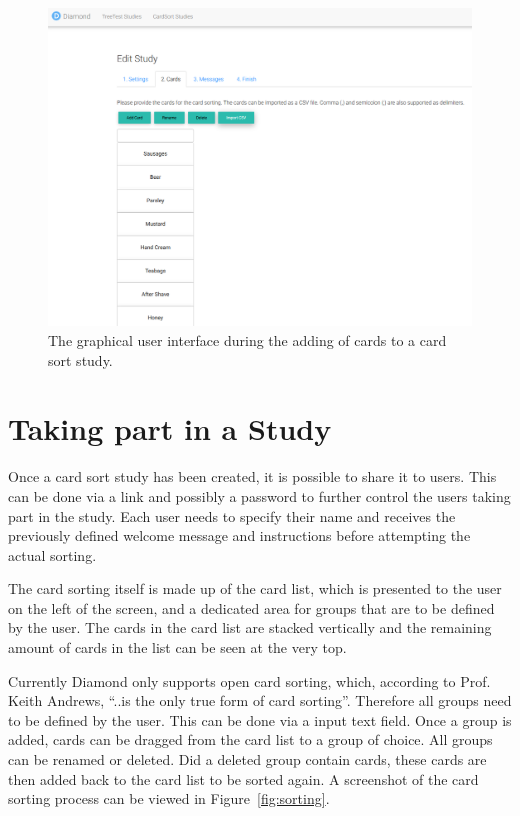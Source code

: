 \begin{figure}[tp]  \centering
\includegraphics[keepaspectratio,width=\linewidth,height=\halfh]{images/implementation/create.png}
\caption[Card Sort Study Creation] 
{The graphical user interface during the adding of cards to a card sort study.
 } 
\label{fig:creation} 
\end{figure}

\section{Taking part in a Study}

Once a card sort study has been created, it is possible to share it to users.
This can be done via a link and possibly a password to further control the users
taking part in the study. Each user needs to specify their name and receives
the previously defined welcome message and instructions before attempting the
actual sorting.

The card sorting itself is made up of the card list, which is presented to the
user on the left of the screen, and a dedicated area for groups that are to be
defined by the user. The cards in the card list are stacked vertically and the
remaining amount of cards in the list can be seen at the very top.  

Currently Diamond only supports open card sorting, which, according to Prof.
Keith Andrews, ``..is the only true form of card sorting''. Therefore all groups
need to be defined by the user. This can be done via a input text field. Once a
group is added, cards can be dragged from the card list to a group of choice.
All groups can be renamed or deleted. Did a deleted group contain cards, these
cards are then added back to the card list to be sorted again. A screenshot of
the card sorting process can be viewed in Figure~\ref{fig:sorting}.


